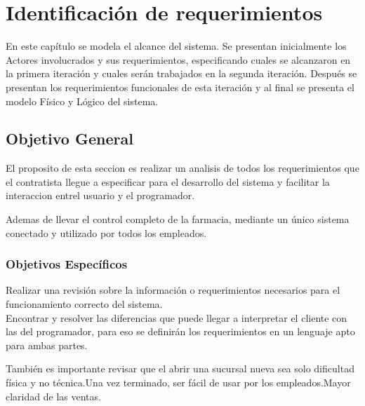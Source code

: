 \chapter{Identificación de requerimientos}
\label{cap:reqUsr}

	En este capítulo se modela el alcance del sistema. Se presentan inicialmente los Actores involucrados y sus requerimientos, especificando cuales se alcanzaron en la primera iteración y cuales serán trabajados en la segunda iteración. Después se presentan los requerimientos funcionales de esta iteración y al final se presenta el modelo Físico y Lógico del sistema.

\section{Objetivo General}

	El proposito de esta seccion es realizar un analisis de todos los requerimientos que el contratista llegue a especificar para el desarrollo del sistema y facilitar la interaccion entrel usuario y el  programador.

Ademas de llevar  el  control  completo  de  la  farmacia,  mediante  un  único  sistema  conectado  y utilizado por todos los empleados.

\subsection{Objetivos Específicos}
	Realizar una revisión sobre la información o requerimientos necesarios para el funcionamiento correcto del sistema.\\
Encontrar y resolver las diferencias que puede llegar a interpretar el cliente con las del programador, para eso se definirán los requerimientos en un lenguaje apto para ambas partes.

También es importante revisar que el abrir una sucursal nueva sea solo dificultad física y no técnica.Una vez terminado, ser fácil de usar por los empleados.Mayor claridad de las ventas.

